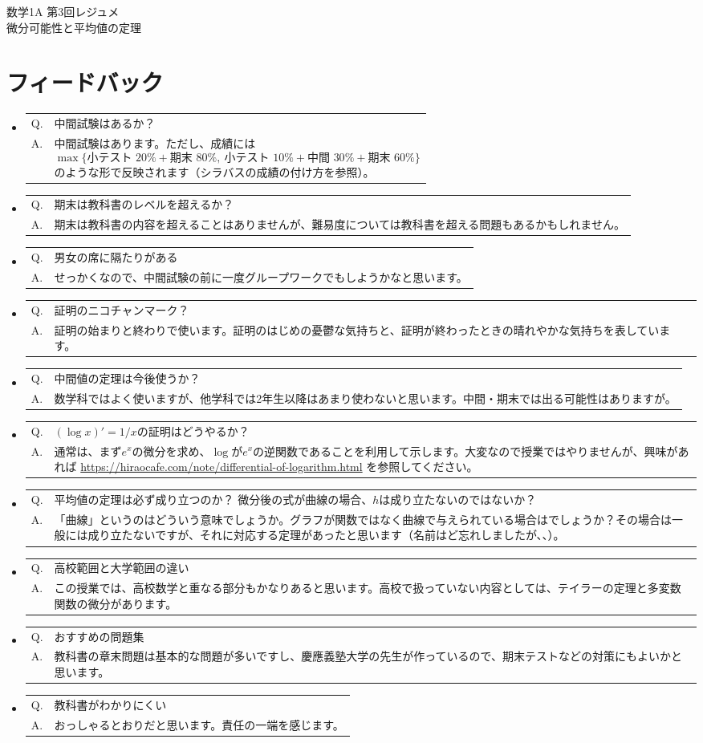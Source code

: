 \documentclass[a4paper,12pt]{article}
\makeatletter
\newcommand{\feedbackqa}[2]{%
\item[]
\begin{tabular}[t]{@{}p{1.8em}@{\hspace{0.4em}}p{\dimexpr\linewidth-2.2em\relax}@{}}
Q. & #1 \\
A. & #2
\end{tabular}
\par\smallskip\hrulefill
}
\makeatother
\begin{document}
\ifPDFTeX
\begin{CJK}{UTF8}{min}
\fi

\theoremstyle{definition}
\newtheorem*{definition}{定義}
\newtheorem*{theorem}{定理}
\newtheorem*{example}{例}
\newtheorem*{remark}{注意}

\begin{center}
{\LARGE 数学1A 第3回レジュメ}\\[0.4em]
微分可能性と平均値の定理
\end{center}

\section*{フィードバック}

\begin{itemize}[leftmargin=1.5em,itemsep=0.7em,topsep=0.3em]
\feedbackqa{中間試験はあるか？}{中間試験はあります。ただし、成績には$$\max\{\text{小テスト }20\%+\text{期末 }80\%,\ \text{小テスト }10\%+\text{中間 }30\%+\text{期末 }60\%\}$$のような形で反映されます（シラバスの成績の付け方を参照）。}
\feedbackqa{期末は教科書のレベルを超えるか？}{期末は教科書の内容を超えることはありませんが、難易度については教科書を超える問題もあるかもしれません。}
\feedbackqa{男女の席に隔たりがある}{せっかくなので、中間試験の前に一度グループワークでもしようかなと思います。}
\feedbackqa{証明のニコチャンマーク？}{証明の始まりと終わりで使います。証明のはじめの憂鬱な気持ちと、証明が終わったときの晴れやかな気持ちを表しています。}
\feedbackqa{中間値の定理は今後使うか？}{数学科ではよく使いますが、他学科では2年生以降はあまり使わないと思います。中間・期末では出る可能性はありますが。}
\feedbackqa{$(\log x)' = 1/x$の証明はどうやるか？}{通常は、まず$e^x$の微分を求め、$\log$が$e^x$の逆関数であることを利用して示します。大変なので授業ではやりませんが、興味があれば \url{https://hiraocafe.com/note/differential-of-logarithm.html} を参照してください。}
\feedbackqa{平均値の定理は必ず成り立つのか？ 微分後の式が曲線の場合、$h$は成り立たないのではないか？}{「曲線」というのはどういう意味でしょうか。グラフが関数ではなく曲線で与えられている場合はでしょうか？その場合は一般には成り立たないですが、それに対応する定理があったと思います（名前はど忘れしましたが、、）。}
\feedbackqa{高校範囲と大学範囲の違い}{この授業では、高校数学と重なる部分もかなりあると思います。高校で扱っていない内容としては、テイラーの定理と多変数関数の微分があります。}
\feedbackqa{おすすめの問題集}{教科書の章末問題は基本的な問題が多いですし、慶應義塾大学の先生が作っているので、期末テストなどの対策にもよいかと思います。} 
\feedbackqa{教科書がわかりにくい}{おっしゃるとおりだと思います。責任の一端を感じます。}

\end{itemize}
\end{CJK}
\end{document}
